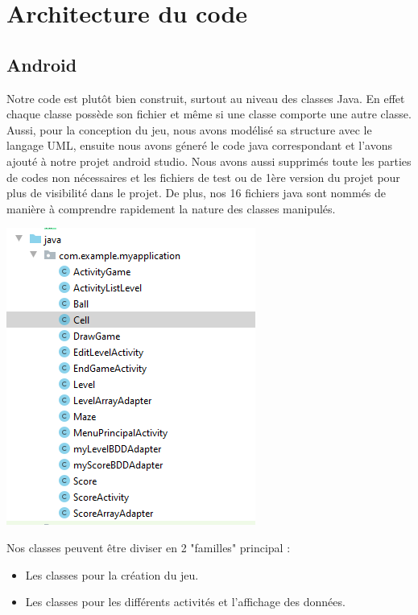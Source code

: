 \documentclass{article}
\begin{document}
\section{Architecture du code}

\subsection{Android} 
Notre code est plutôt bien construit, surtout au niveau des classes Java. En effet chaque classe possède son fichier et même si une classe comporte une autre classe. Aussi, pour la conception du jeu, nous avons modélisé sa structure avec le langage UML, ensuite nous avons géneré le code java correspondant et l'avons ajouté à notre projet android studio. Nous avons aussi supprimés toute les parties de codes non nécessaires et les fichiers de test ou de 1ère version du projet pour plus de visibilité dans le projet. De plus, nos 16 fichiers java sont nommés de manière à comprendre rapidement la nature des classes manipulés. 
\begin{center}
  \includegraphics[scale=1]{fichiers.PNG} 
\end{center}
Nos classes peuvent être diviser en 2 "familles" principal :
\begin{itemize}
\item Les classes pour la création du jeu.
\item Les classes pour les différents activités et l'affichage des données.
\end{itemize}
\end{document}
